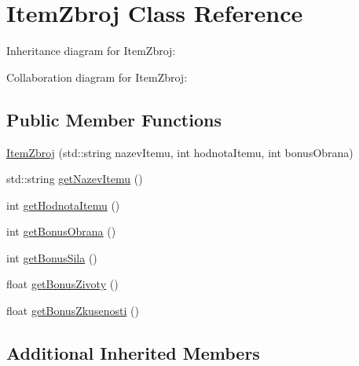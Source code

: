 \hypertarget{class_item_zbroj}{\section{Item\-Zbroj Class Reference}
\label{class_item_zbroj}
}


Inheritance diagram for Item\-Zbroj\-:


Collaboration diagram for Item\-Zbroj\-:
\subsection*{Public Member Functions}
\begin{DoxyCompactItemize}
\item 
\hyperlink{class_item_zbroj_a01508238cf14235f11b45daf827fe916}{Item\-Zbroj} (std\-::string nazev\-Itemu, int hodnota\-Itemu, int bonus\-Obrana)
\item 
std\-::string \hyperlink{class_item_zbroj_a36884ef066b5e6c851ad0856320a31c1}{get\-Nazev\-Itemu} ()
\item 
int \hyperlink{class_item_zbroj_a77ec9d70488a8ea7145a70586c007a74}{get\-Hodnota\-Itemu} ()
\item 
int \hyperlink{class_item_zbroj_a2b780670b0ce4bc0a6812bb9c172f48c}{get\-Bonus\-Obrana} ()
\item 
int \hyperlink{class_item_zbroj_afcb8a75f328c9e1a4cc2d1d3c18bd97f}{get\-Bonus\-Sila} ()
\item 
float \hyperlink{class_item_zbroj_a03c46d5044beacd0749ca18b5335a54c}{get\-Bonus\-Zivoty} ()
\item 
float \hyperlink{class_item_zbroj_ab809828ad68d3873ff294a980a1c7a81}{get\-Bonus\-Zkusenosti} ()
\end{DoxyCompactItemize}
\subsection*{Additional Inherited Members}


